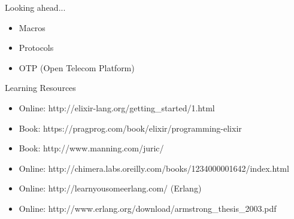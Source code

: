 \documentclass{beamer}
\begin{document}
\begin{frame}[fragile]{Looking ahead...}

\begin{itemize}

\item Macros
\item Protocols
\item OTP (Open Telecom Platform)

\end{itemize}

\end{frame}

\begin{frame}[fragile]{Learning Resources}

\begin{itemize}

\item Online: http://elixir-lang.org/getting\_started/1.html

\item Book: https://pragprog.com/book/elixir/programming-elixir 

\item Book: http://www.manning.com/juric/ 

\item Online: http://chimera.labs.oreilly.com/books/1234000001642/index.html

\item Online: http://learnyousomeerlang.com/ (Erlang)

\item Online: http://www.erlang.org/download/armstrong\_thesis\_2003.pdf

\end{itemize}

\end{frame}

\end{document}
